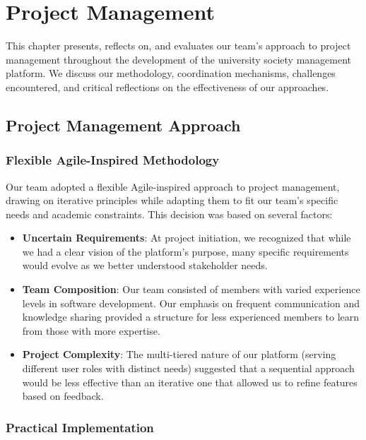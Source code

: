 \chapter{Project Management}
\label{chap:project-management}

This chapter presents, reflects on, and evaluates our team's approach to project management throughout the development of the university society management platform. We discuss our methodology, coordination mechanisms, challenges encountered, and critical reflections on the effectiveness of our approaches.

\section{Project Management Approach}

\subsection{Flexible Agile-Inspired Methodology}

Our team adopted a flexible Agile-inspired approach to project management, drawing on iterative principles while adapting them to fit our team's specific needs and academic constraints. This decision was based on several factors:

\begin{itemize}
    \item \textbf{Uncertain Requirements}: At project initiation, we recognized that while we had a clear vision of the platform's purpose, many specific requirements would evolve as we better understood stakeholder needs.
    
    \item \textbf{Team Composition}: Our team consisted of members with varied experience levels in software development. Our emphasis on frequent communication and knowledge sharing provided a structure for less experienced members to learn from those with more expertise.
    
    \item \textbf{Project Complexity}: The multi-tiered nature of our platform (serving different user roles with distinct needs) suggested that a sequential approach would be less effective than an iterative one that allowed us to refine features based on feedback.
\end{itemize}

\subsection{Practical Implementation}

